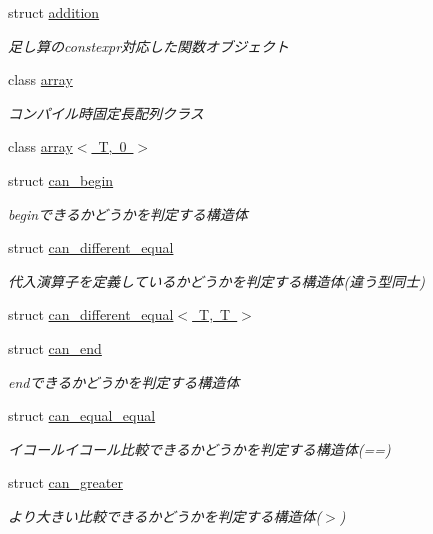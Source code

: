 \begin{DoxyCompactItemize}
\item 
struct \mbox{\hyperlink{structsaki_1_1addition}{addition}}
\begin{DoxyCompactList}\small\item\em 足し算のconstexpr対応した関数オブジェクト \end{DoxyCompactList}\item 
class \mbox{\hyperlink{classsaki_1_1array}{array}}
\begin{DoxyCompactList}\small\item\em コンパイル時固定長配列クラス \end{DoxyCompactList}\item 
class \mbox{\hyperlink{classsaki_1_1array_3_01_t_00_010_01_4}{array$<$ T, 0 $>$}}
\item 
struct \mbox{\hyperlink{structsaki_1_1can__begin}{can\+\_\+begin}}
\begin{DoxyCompactList}\small\item\em beginできるかどうかを判定する構造体 \end{DoxyCompactList}\item 
struct \mbox{\hyperlink{structsaki_1_1can__different__equal}{can\+\_\+different\+\_\+equal}}
\begin{DoxyCompactList}\small\item\em 代入演算子を定義しているかどうかを判定する構造体(違う型同士) \end{DoxyCompactList}\item 
struct \mbox{\hyperlink{structsaki_1_1can__different__equal_3_01_t_00_01_t_01_4}{can\+\_\+different\+\_\+equal$<$ T, T $>$}}
\item 
struct \mbox{\hyperlink{structsaki_1_1can__end}{can\+\_\+end}}
\begin{DoxyCompactList}\small\item\em endできるかどうかを判定する構造体 \end{DoxyCompactList}\item 
struct \mbox{\hyperlink{structsaki_1_1can__equal__equal}{can\+\_\+equal\+\_\+equal}}
\begin{DoxyCompactList}\small\item\em イコールイコール比較できるかどうかを判定する構造体(==) \end{DoxyCompactList}\item 
struct \mbox{\hyperlink{structsaki_1_1can__greater}{can\+\_\+greater}}
\begin{DoxyCompactList}\small\item\em より大きい比較できるかどうかを判定する構造体($>$) \end{DoxyCompactList}\item 

\end{DoxyCompactItemize}
